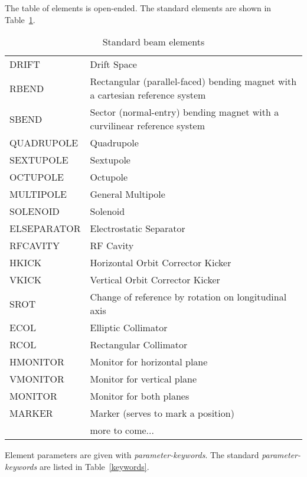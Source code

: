 \documentclass{article}
\begin{document}
The table of elements is open-ended.
The standard elements are shown in Table~\ref{elements}.
\begin{table}[htb]
  \centering
  \caption{Standard beam elements}
  \label{elements}
  \vspace{1em}
  \begin{tabular}{|lp{}|}
    \hline
    DRIFT       & Drift Space \\
    RBEND       & Rectangular (parallel-faced) bending magnet
                  with a cartesian reference system \\
    SBEND       & Sector (normal-entry) bending magnet
                  with a curvilinear reference system \\
    QUADRUPOLE  & Quadrupole \\
    SEXTUPOLE   & Sextupole \\
    OCTUPOLE    & Octupole \\
    MULTIPOLE   & General Multipole \\
    SOLENOID    & Solenoid \\
    ELSEPARATOR & Electrostatic Separator \\
    RFCAVITY    & RF Cavity \\
    HKICK       & Horizontal Orbit Corrector Kicker \\
    VKICK       & Vertical Orbit Corrector Kicker \\
    SROT        & Change of reference by rotation on longitudinal axis \\
    ECOL        & Elliptic Collimator \\
    RCOL        & Rectangular Collimator \\
    HMONITOR    & Monitor for horizontal plane \\
    VMONITOR    & Monitor for vertical plane \\
    MONITOR     & Monitor for both planes \\
    MARKER      & Marker (serves to mark a position) \\
                & more to come... \\
    \hline
  \end{tabular}
\end{table}
Element parameters are given with {\em parameter-keywords}.
The standard {\em parameter-keywords} are listed in
Table~\ref{keywords}.
\end{document}
